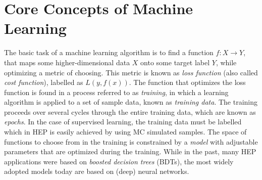 


\section{Core Concepts of Machine Learning}
\label{sec:core-concepts}
The basic task of a machine learning algorithm is to find a function $f: X \rightarrow Y$, that maps some higher-dimensional data $X$ onto some target label $Y$, while optimizing a metric of choosing.
This metric is known as \emph{loss function} (also called \emph{cost function}), labelled as $L(y, f(x))$.
The function that optimizes the loss function is found in a process referred to as \emph{training}, in which a learning algorithm is applied to a set of sample data, known as \emph{training data}.
The training proceeds over several cycles through the entire training data, which are known as \emph{epochs}. 
In the case of supervised learning, the training data must be labelled which in HEP is easily achieved by using MC simulated samples. 
The space of functions to choose from in the training is constrained by a \emph{model} with adjustable parameters that are optimized during the training.
While in the past, many HEP applications were based on \emph{boosted decision trees} (BDTs), the most widely adopted models today are based on (deep) neural networks.

